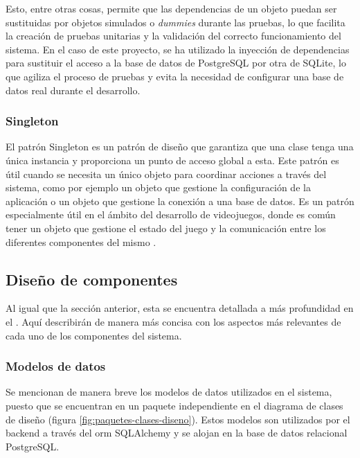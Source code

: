 Esto, entre otras cosas, permite que las dependencias de un objeto puedan ser
sustituidas por objetos simulados o \textit{dummies} durante las pruebas, lo que
facilita la creación de pruebas unitarias y la validación del correcto
funcionamiento del sistema. En el caso de este proyecto, se ha utilizado la
inyección de dependencias para sustituir el acceso a la base de datos de
PostgreSQL por otra de SQLite, lo que agiliza el proceso de pruebas y evita la
necesidad de configurar una base de datos real durante el desarrollo.

\subsubsection{Singleton}
El patrón Singleton es un patrón de diseño que garantiza que una clase tenga una
única instancia y proporciona un punto de acceso global a esta. Este patrón es
útil cuando se necesita un único objeto para coordinar acciones a través del
sistema, como por ejemplo un objeto que gestione la configuración de la
aplicación o un objeto que gestione la conexión a una base de datos.  Es un
patrón especialmente útil en el ámbito del desarrollo de videojuegos, donde es
común tener un objeto que gestione el estado del juego y la comunicación entre
los diferentes componentes del mismo \parencite{GameProgrammingPatterns}.


\subsection{Diseño de componentes}
Al igual que la sección anterior, esta se encuentra detallada a más profundidad
en el \segundoAnexo. Aquí describirán de manera más concisa con los aspectos más
relevantes de cada uno de los componentes del sistema.

\subsubsection{Modelos de datos}
Se mencionan de manera breve los modelos de datos utilizados en el sistema, puesto que se
encuentran en un paquete independiente en el diagrama de clases de diseño
(figura \ref{fig:paquetes-clases-diseno}). Estos modelos son utilizados por el \gls{backend} a
través del \gls{orm} SQLAlchemy y se alojan en la base de datos relacional PostgreSQL.

